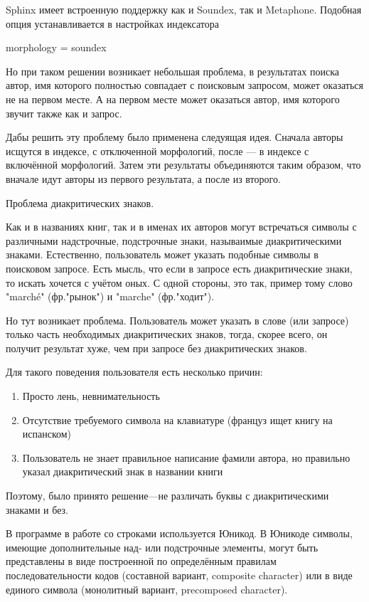 Sphinx имеет встроенную поддержку как и Soundex, так и Metaphone. Подобная опция устанавливается в настройках индексатора

morphology = soundex


Но при таком решении возникает небольшая проблема, в результатах поиска автор, имя которого полностью совпадает с поисковым запросом, может оказаться не на первом месте. А на первом месте может оказаться автор, имя которого звучит также как и запрос.

Дабы решить эту проблему было применена следуящая идея. 
Сначала авторы исщутся в индексе, с отключенной морфологий, после --- в индексе с включённой морфологий.
Затем эти результаты объединяются таким образом, что вначале идут авторы из первого результата, а после из второго.



Проблема диакритических знаков.

Как и в названиях книг, так и в именах их авторов могут встречаться символы с различными надстрочные, подстрочные знаки, называимые диакритическими знаками. Естественно, пользователь может указать подобные символы в поисковом запросе.
Есть мысль, что если в запросе есть диакритические знаки, то искать хочется с учётом оных. С одной стороны, это так, пример тому слово "marché" (фр."рынок") и "marche" (фр."ходит"). 

Но тут возникает проблема. Пользователь может указать в слове (или запросе) только часть необходимых диакритических знаков, тогда, скорее всего, он получит результат хуже, чем при запросе без диакритических знаков. 

Для такого поведения пользователя есть несколько причин:
\begin{enumerate}
    \item Просто лень, невнимательность 
    \item Отсутствие требуемого символа на клавиатуре (француз ищет книгу на испанском) 
    \item Пользователь не знает правильное написание фамили автора, но правильно указал диакритический знак в названии книги 
\end{enumerate}

Поэтому, было принято решение---не различать буквы с диакритическими знаками и без.

В программе в работе со строками используется Юникод.
В Юникоде символы, имеющие дополнительные над- или подстрочные элементы, 
могут быть представлены в виде построенной по определённым правилам последовательности кодов (составной вариант, composite character) 
или в виде единого символа (монолитный вариант, precomposed character).

